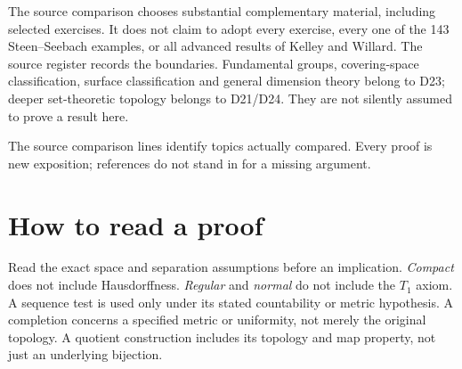 \documentclass[11pt,oneside,openany]{book}
\theoremstyle{definition}
\theoremstyle{remark}
\newcounter{foundation}
\begin{document}
The source comparison chooses substantial complementary material, including
selected exercises. It does not claim to adopt every exercise, every one of the
143 Steen--Seebach examples, or all advanced results of Kelley and Willard.
The source register records the boundaries. Fundamental groups, covering-space
classification, surface classification and general dimension theory belong to
D23; deeper set-theoretic topology belongs to D21/D24. They are not silently
assumed to prove a result here.

The source comparison lines identify topics actually compared. Every proof is
new exposition; references do not stand in for a missing argument.

\section*{How to read a proof}
Read the exact space and separation assumptions before an implication.
\emph{Compact} does not include Hausdorffness. \emph{Regular} and \emph{normal}
do not include the $T_1$ axiom. A sequence test is used only under its stated
countability or metric hypothesis. A completion concerns a specified metric or
uniformity, not merely the original topology. A quotient construction includes
its topology and map property, not just an underlying bijection.


\tableofcontents

\end{document}

